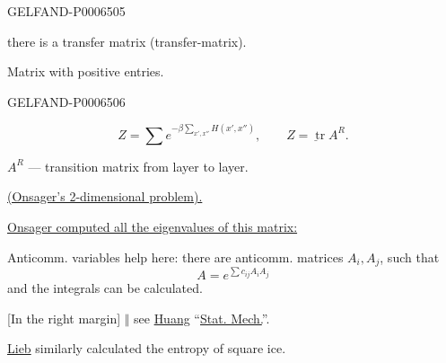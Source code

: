 \begin{GelfandAdjacentEvidence}{GELFAND-P000650}{5}

there is a transfer matrix (transfer-matrix).

Matrix with positive entries.
\end{GelfandAdjacentEvidence}
\begin{GelfandAdjacentEvidence}{GELFAND-P000650}{6}

\[
Z=\sum e^{-\beta\sum_{x',x''}H(x',x'')},
\qquad \underline{Z=\operatorname{tr}A^R}.
\]
\end{GelfandAdjacentEvidence}

\(A^R\) --- transition matrix from layer to layer.

\underline{(Onsager’s 2-dimensional problem).}

\underline{Onsager computed all the eigenvalues of this matrix:}

Anticomm. variables help here: there are anticomm. matrices \(A_i,A_j\), such that
\[
A=e^{\sum c_{ij}A_i A_j}
\]
and the integrals can be calculated.

[In the right margin] \(\Vert\) see \underline{Huang} “\underline{Stat. Mech.}”.

\underline{Lieb} similarly calculated the entropy of square ice.

\begin{center}\textemdash\enspace\textperiodcentered\enspace\textemdash\end{center}


